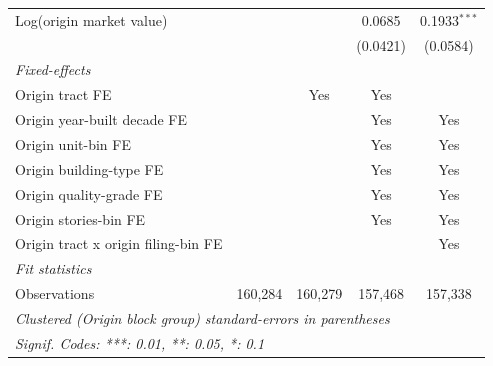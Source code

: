 \begin{tabular}{lcccc}
   Log(origin market value)                       &          &          & 0.0685          & 0.1933$^{***}$\\   
                                                  &          &          & (0.0421)        & (0.0584)\\   
   \midrule
   \emph{Fixed-effects}\\
   Origin tract FE                                &          & Yes      & Yes             & \\  
   Origin year-built decade FE                    &          &          & Yes             & Yes\\  
   Origin unit-bin FE                             &          &          & Yes             & Yes\\  
   Origin building-type FE                        &          &          & Yes             & Yes\\  
   Origin quality-grade FE                        &          &          & Yes             & Yes\\  
   Origin stories-bin FE                          &          &          & Yes             & Yes\\  
   Origin tract x origin filing-bin FE            &          &          &                 & Yes\\  
   \midrule
   \emph{Fit statistics}\\
   Observations                                   & 160,284  & 160,279  & 157,468         & 157,338\\  
   \midrule \midrule
   \multicolumn{5}{l}{\emph{Clustered (Origin block group) standard-errors in parentheses}}\\
   \multicolumn{5}{l}{\emph{Signif. Codes: ***: 0.01, **: 0.05, *: 0.1}}\\
\end{tabular}
\par\endgroup
